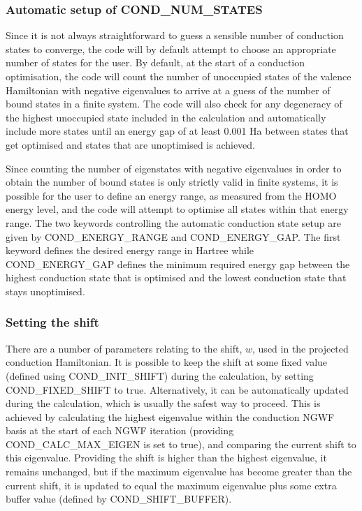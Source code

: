 \documentclass[letterpaper,10pt,english]{sphinxmanual}
\begin{document}
\subsubsection{Automatic setup of COND\_NUM\_STATES}
\label{\detokenize{conduction:automatic-setup-of-cond-num-states}}
Since it is not always straightforward to guess a sensible number of
conduction states to converge, the code will by default attempt to
choose an appropriate number of states for the user. By default, at the
start of a conduction optimisation, the code will count the number of
unoccupied states of the valence Hamiltonian with negative eigenvalues
to arrive at a guess of the number of bound states in a finite system.
The code will also check for any degeneracy of the highest unoccupied
state included in the calculation and automatically include more states
until an energy gap of at least 0.001 Ha between states that get
optimised and states that are unoptimised is achieved.

Since counting the number of eigenstates with negative eigenvalues in
order to obtain the number of bound states is only strictly valid in
finite systems, it is possible for the user to define an energy range,
as measured from the HOMO energy level, and the code will attempt to
optimise all states within that energy range. The two keywords
controlling the automatic conduction state setup are given by
COND\_ENERGY\_RANGE and COND\_ENERGY\_GAP. The first keyword defines the
desired energy range in Hartree while COND\_ENERGY\_GAP defines the
minimum required energy gap between the highest conduction state that is
optimised and the lowest conduction state that stays unoptimised.


\subsubsection{Setting the shift}
\label{\detokenize{conduction:setting-the-shift}}
There are a number of parameters relating to the shift, \(w\), used
in the projected conduction Hamiltonian. It is possible to keep the
shift at some fixed value (defined using COND\_INIT\_SHIFT) during the
calculation, by setting COND\_FIXED\_SHIFT to true. Alternatively, it
can be automatically updated during the calculation, which is usually
the safest way to proceed. This is achieved by calculating the highest
eigenvalue within the conduction NGWF basis at the start of each NGWF
iteration (providing COND\_CALC\_MAX\_EIGEN is set to true), and
comparing the current shift to this eigenvalue. Providing the shift is
higher than the highest eigenvalue, it remains unchanged, but if the
maximum eigenvalue has become greater than the current shift, it is
updated to equal the maximum eigenvalue plus some extra buffer value
(defined by COND\_SHIFT\_BUFFER).
\end{document}
